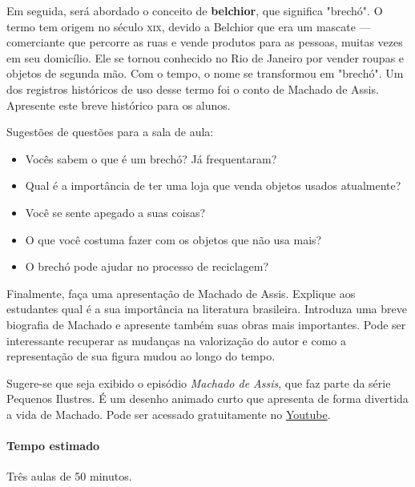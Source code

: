 \documentclass[11pt]{extarticle}
\begin{document}
Em seguida, será abordado o conceito de \textbf{belchior}, que significa "brechó". O termo tem origem no século \textsc{xix}, devido a Belchior que era um mascate --- comerciante que percorre as ruas e vende produtos para as pessoas, muitas vezes em seu domicílio. Ele se tornou conhecido no Rio de Janeiro por vender roupas e objetos de segunda mão. Com o tempo, o nome se transformou em "brechó". Um dos registros históricos de uso desse termo foi o conto de Machado de Assis. Apresente este breve histórico para os alunos.


Sugestões de questões para a sala de aula:

\begin{itemize}

\item Vocês sabem o que é um brechó? Já frequentaram?

\item Qual é a importância de ter uma loja que venda objetos usados atualmente?

\item Você se sente apegado a suas coisas?

\item O que você costuma fazer com os objetos que não usa mais?

\item O brechó pode ajudar no processo de reciclagem?

\end{itemize}

Finalmente, faça uma apresentação de Machado de Assis. Explique aos estudantes qual é a sua importância na literatura brasileira. Introduza uma breve biografia de Machado e apresente também suas obras mais importantes. Pode ser interessante recuperar as mudanças na valorização do autor e como a representação de sua figura mudou ao longo do tempo. 

Sugere-se que seja exibido o episódio \textit{Machado de Assis}, que faz parte da série Pequenos Ilustres. É um desenho animado curto que apresenta de forma divertida a vida de Machado. Pode ser acessado gratuitamente no \href{https://youtu.be/ahafgLr7M0I}{Youtube}.

\paragraph{Tempo estimado} Três aulas de 50 minutos.
\end{document}
